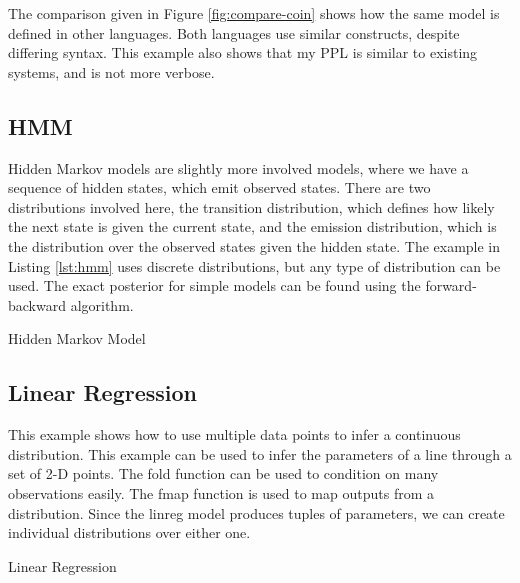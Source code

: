 The comparison given in Figure \ref{fig:compare-coin} shows how the same model is defined in other languages. Both languages use similar constructs, despite differing syntax. This example also shows that my PPL is similar to existing systems, and is not more verbose.

\subsection{HMM}
Hidden Markov models are slightly more involved models, where we have a sequence of hidden states, which emit observed states. There are two distributions involved here, the transition distribution, which defines how likely the next state is given the current state, and the emission distribution, which is the distribution over the observed states given the hidden state. The example in Listing \ref{lst:hmm} uses discrete distributions, but any type of distribution can be used. The exact posterior for simple models can be found using the forward-backward algorithm.
\begin{listing}[!ht]
	\caption{Hidden Markov Model}
	\label{lst:hmm}
\end{listing}

\subsection{Linear Regression}
This example shows how to use multiple data points to infer a continuous distribution. This example can be used to infer the parameters of a line through a set of 2-D points. The fold function can be used to condition on many observations easily. The fmap function is used to map outputs from a distribution. Since the linreg model produces tuples of parameters, we can create individual distributions over either one.

\begin{listing}[!ht]
	\caption{Linear Regression}
	\label{lst:linreg}
\end{listing}

